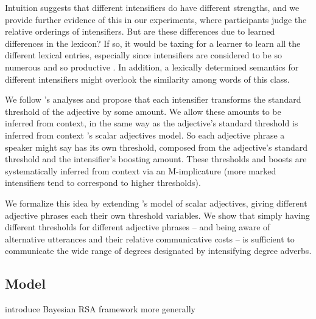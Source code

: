 \documentclass[10pt,letterpaper]{article}
\newcommand{\todo}[1]{{\color{red}#1}}
\begin{document}


Intuition suggests that different intensifiers do have different strengths, and we provide further evidence of this in our experiments, where participants judge the relative orderings of intensifiers. But are these differences due to learned differences in the lexicon?
If so, it would be taxing for a learner to learn all the different lexical entries, especially since intensifiers are considered to be so numerous and so productive
\cite{bolinger}.
In addition, a lexically determined semantics for different intensifiers might overlook the similarity among words of this class.

We follow 's analyses and propose that each intensifier transforms the standard threshold of the adjective by some amount. We allow these amounts to be inferred from context, in the same way as the adjective's standard threshold is inferred from context 's scalar adjectives model.
So each adjective phrase a speaker might say has its own threshold, composed from the adjective's standard threshold and the intensifier's boosting amount. These thresholds and boosts are systematically inferred from context via an M-implicature (more marked intensifiers tend to correspond to higher thresholds).

We formalize this idea by extending 's model of scalar adjectives, giving different adjective phrases each their own threshold variables. We show that simply having different thresholds for different adjective phrases -- and being aware of alternative utterances and their relative communicative costs -- is sufficient to communicate the wide range of degrees designated by intensifying degree adverbs.

\subsection{Model}

\todo{introduce Bayesian RSA framework more generally}
\end{document}
